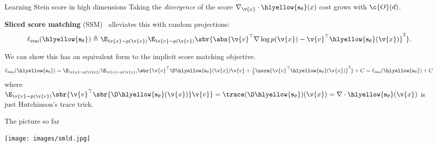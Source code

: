 \begin{frame}{Learning Stein score in high dimensions}
    Taking the \textit{divergence} of the score $\nabla_{\v{x}} \cdot \hlyellow{\mathbf{s}_\theta}(x)$ cost grows with $\c{O}(d)$.
    
    \textbf{Sliced score matching} (SSM)~\cite{song2019Sliced} alleviates this with random projections:
    \begin{equation}
        \ell_{\mathrm{ssm}}(\hlyellow{\mathbf{s}_\theta}) \triangleq \E_{\v{x} \sim p(\v{x})} \E_{\v{v}\sim p(\v{v})} \sbr{
            \abs{\v{v}^\top\nabla \log p(\v{x}) - \v{v}^\top \hlyellow{\mathbf{s}_\theta}(\v{x})}^2
        }.
    \end{equation}
    
    \pause
    We can show this has an equivalent form to the implicit score matching objective.
    \begin{equation}
        \ell_{\mathrm{ssm}}(\hlyellow{\mathbf{s}_\theta}) = \E_{\v{x} \sim p(\v{x})} \E_{\v{v} \sim p(\v{v})} \sbr{
            \v{v}^\top \D \hlyellow{\mathbf{s}_\theta}(\v{x}) \v{v} + \tfrac{1}{2} \norm{\v{v}^\top \hlyellow{\mathbf{s}_\theta}(\v{x})}^2
        } + C
        = \ell_{\mathrm{ism}}(\hlyellow{\mathbf{s}_\theta}) + C
    \end{equation}
    where $\E_{\v{v} \sim p(\v{v})} \sbr{\v{v}^\top \sbr{\D \hlyellow{\mathbf{s}_\theta}(\v{x})} \v{v}} = \trace(\D \hlyellow{\mathbf{s}_\theta})(\v{x}) = \nabla \cdot \hlyellow{\mathbf{s}_\theta}(\v{x})$ is just Hutchinson's trace trick.
\end{frame}

\begin{frame}{The picture so far}

\texttt{[image: images/smld.jpg]}

\end{frame}



